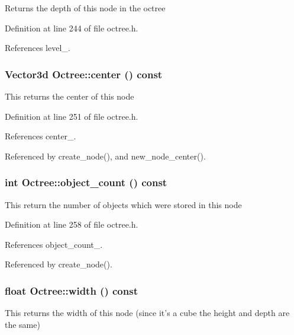 Returns the depth of this node in the octree 

Definition at line 244 of file octree.h.

References level\_\-.\hypertarget{class_octree_8a7a88c27aa9a48f6fbdfd6db5faa455}{
\subsubsection[center]{\setlength{\rightskip}{0pt plus 5cm}Vector3d Octree::center () const}}
\label{class_octree_8a7a88c27aa9a48f6fbdfd6db5faa455}


This returns the center of this node 

Definition at line 251 of file octree.h.

References center\_\-.

Referenced by create\_\-node(), and new\_\-node\_\-center().\hypertarget{class_octree_88cb79978d550bdd2699c15fe9879fc4}{
\subsubsection[object\_\-count]{\setlength{\rightskip}{0pt plus 5cm}int Octree::object\_\-count () const}}
\label{class_octree_88cb79978d550bdd2699c15fe9879fc4}


This return the number of objects which were stored in this node 

Definition at line 258 of file octree.h.

References object\_\-count\_\-.

Referenced by create\_\-node().\hypertarget{class_octree_174fc16c8dda632cf8c0ba7bfc9db4b0}{
\subsubsection[width]{\setlength{\rightskip}{0pt plus 5cm}float Octree::width () const}}
\label{class_octree_174fc16c8dda632cf8c0ba7bfc9db4b0}


This returns the width of this node (since it's a cube the height and depth are the same) 


